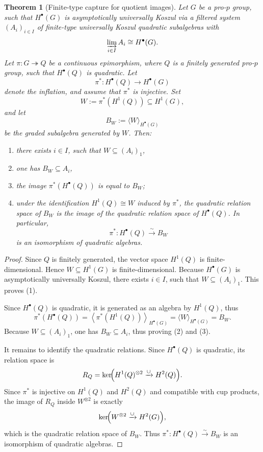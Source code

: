 \documentclass[11pt]{amsart}
\numberwithin{equation}{section}
\newtheorem{theorem}{Theorem}[section]
\theoremstyle{definition}
\begin{document}
	\begin{theorem}[Finite-type capture for quotient images]\label{thm:quotient-obstruction}
		Let \(G\) be a pro-\(p\) group, such that \(H^\bullet(G)\) is asymptotically universally Koszul via a filtered system \((A_i)_{i\in I}\) of finite-type universally Koszul quadratic subalgebras with
		\[\varinjlim_{i\in I} A_i \cong H^\bullet(G).\]
		Let \(\pi\colon G\twoheadrightarrow Q\) be a continuous epimorphism, where \(Q\) is a finitely generated pro-\(p\) group, such that \(H^\bullet(Q)\) is quadratic. Let
		\[\pi^*\colon H^\bullet(Q)\longrightarrow H^\bullet(G)\]
		denote the inflation, and assume that \(\pi^*\) is injective. Set
		\[W:=\pi^*(H^1(Q))\subseteq H^1(G),\]
		and let
		\[B_W:=\langle W\rangle_{H^\bullet(G)}\]
		be the graded subalgebra generated by \(W\).
		Then:
		\begin{enumerate}
			\item there exists \(i\in I\), such that \(W\subseteq (A_i)_1\),
			\item one has \(B_W\subseteq A_i\),
			\item the image \(\pi^*(H^\bullet(Q))\) is equal to \(B_W\);
			\item under the identification \(H^1(Q)\cong W\) induced by \(\pi^*\), the quadratic relation space of \(B_W\) is the image of the quadratic relation space of \(H^\bullet(Q)\). In particular,
			\[\pi^*\colon H^\bullet(Q)\xrightarrow{\sim} B_W\] is an isomorphism of quadratic algebras.
		\end{enumerate}
	\end{theorem}
	
	\begin{proof}
		Since \(Q\) is finitely generated, the vector space \(H^1(Q)\) is finite-dimensional. Hence \(W\subseteq H^1(G)\) is finite-dimensional. Because \(H^\bullet(G)\) is asymptotically universally Koszul, there exists \(i\in I\), such that $W\subseteq (A_i)_1$. This proves (1).
		
		Since $H^\bullet(Q)$ is quadratic, it is generated as an algebra by $H^1(Q)$, thus 
		\[\pi^*(H^\bullet(Q)) = \left\langle \pi^* (H^1(Q))\right\rangle_{H^\bullet(G)}=\langle W \rangle_{H^\bullet(G)}=B_W.\]
		Because $W\subseteq (A_i)_1$, one has $B_W\subseteq A_i$, thus proving (2) and (3). 
		
		It remains to identify the quadratic relations. Since $H^\bullet(Q)$ is quadratic, its relation space is 
		\[R_Q= \ker\!\Bigl(H^1(Q)^{\otimes 2}\xrightarrow{\cup} H^2(Q)\Bigr).\]
		Since \(\pi^*\) is injective on \(H^1(Q)\) and \(H^2(Q)\) and compatible with cup products, the image of \(R_Q\) inside \(W^{\otimes 2}\) is exactly
		\[\ker\!\Bigl(W^{\otimes 2}\xrightarrow{\cup} H^2(G)\Bigr),\]
		which is the quadratic relation space of \(B_W\). Thus $ \pi^*\colon H^\bullet(Q)\xrightarrow{\sim} B_W$ is an isomorphism of quadratic algebras.
	\end{proof}
	
\end{document}
